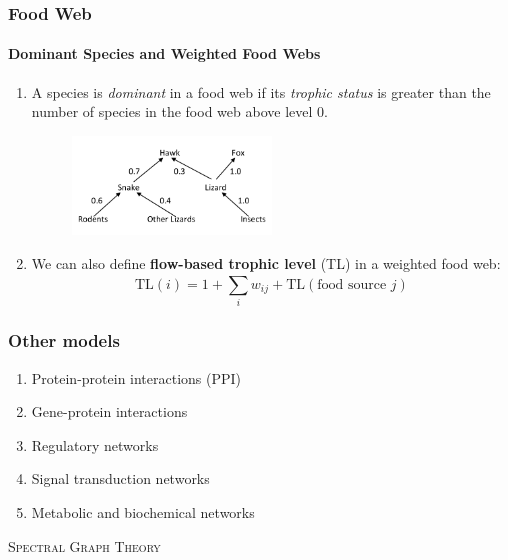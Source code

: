 \documentclass[aspectratio=43,leqno]{beamer}
\begin{document}
\begin{frame}
  \frametitle{Food Web}
  \framesubtitle{Dominant Species and Weighted Food Webs}
  
\begin{enumerate}
\item\label{item:13} A species is\emph{ dominant} in a food web if its \emph{trophic status} is greater than the number of species in the food web above level $0$. \pause
    \begin{figure}[h]
    \centering
    \includegraphics[width=0.5\textwidth]{images/weighted-food-web.png}
    \label{fig:mesh1}
  \end{figure} \pause
\item\label{item:14} We can also define \textbf{flow-based trophic level} (TL) in a weighted food web: 
\begin{displaymath}
\text{TL}(i) = 1 + \sum_i^{} w_{ij} + \text{TL}(\text{food source } j)
\end{displaymath}
\end{enumerate}
  
\end{frame}

\begin{frame}
  \frametitle{Other models}
\begin{enumerate}
\item\label{item:15} Protein-protein interactions (PPI) 
\item\label{item:16} Gene-protein interactions 
\item\label{item:25} Regulatory networks 
\item\label{item:26} Signal transduction networks 
\item\label{item:27} Metabolic and biochemical networks
\end{enumerate}
\end{frame}


\begin{frame}
  \vfill
\begin{center}
 \textsc{Spectral Graph Theory}
\end{center}
  \vfill
\end{frame}
\end{document}
